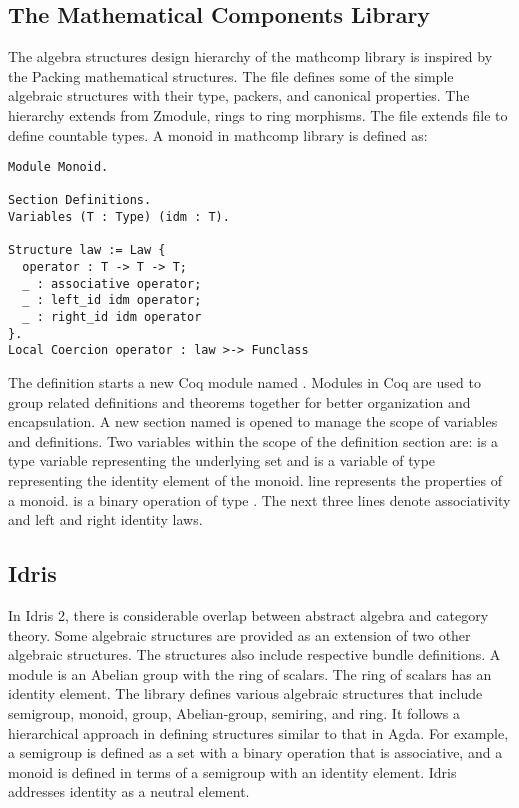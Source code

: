 \subsection{The Mathematical Components Library}
The algebra structures design hierarchy of the mathcomp library is inspired by
the Packing mathematical structures. The  file defines
some of the simple algebraic structures with their type, packers, and canonical
properties. The hierarchy extends from Zmodule, rings to ring morphisms. The
 file extends  file to define
countable types. A monoid in mathcomp library is defined as:

\begin{verbatim}
Module Monoid.

Section Definitions.
Variables (T : Type) (idm : T).

Structure law := Law {
  operator : T -> T -> T;
  _ : associative operator;
  _ : left_id idm operator;
  _ : right_id idm operator
}.
Local Coercion operator : law >-> Funclass
\end{verbatim}

The definition starts a new Coq module named . Modules
in Coq are used to group related definitions and theorems together for better
organization and encapsulation. A new section named
 is opened to manage the scope of variables and
definitions. Two variables within the scope of the definition section are:
 is a type variable representing the underlying set and
 is a variable of type  representing the identity element
of the monoid.  line represents
the properties of a monoid.  is a binary operation of type
. The next three lines denote associativity and
left and right identity laws.

\subsection{Idris}

In Idris 2, there is considerable overlap between abstract algebra and category
theory. Some algebraic structures are provided as an extension of two other
algebraic structures. The structures also include respective bundle definitions.
A module is an Abelian group with the ring of scalars. The ring of scalars has
an identity element. The library defines various algebraic structures that
include semigroup, monoid, group, Abelian-group, semiring, and ring. It follows
a hierarchical approach in defining structures similar to that in Agda. For
example, a semigroup is defined as a set with a binary operation that is
associative, and a monoid is defined in terms of a semigroup with an identity
element. Idris addresses identity as a neutral element.

